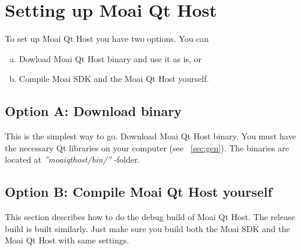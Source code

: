 \chapter{Setting up Moai Qt Host}
\label{chap:setupshort}

To set up Moai Qt Host you have two options. You can
\begin{enumerate}[(a)]
\item Dowload Moai Qt Host binary and use it as is, or
\item Compile Moai SDK and the Moai Qt Host yourself. 
\end{enumerate}

\section{Option A: Download binary}

This is the simplest way to go. Download Moai Qt Host binary. You must have the necessary Qt libraries on your computer (see ~\ref{sec:gen}).
The binaries are located at \textit{''moaiqthost/bin/''} -folder.

\section{Option B: Compile Moai Qt Host yourself}
\label{sec:buildhost}

This section describes how to do the debug build of Moai Qt Host. 
The release build is built similarly. 
Just make sure you build both the Moai SDK and the Moai Qt Host with same settings.

